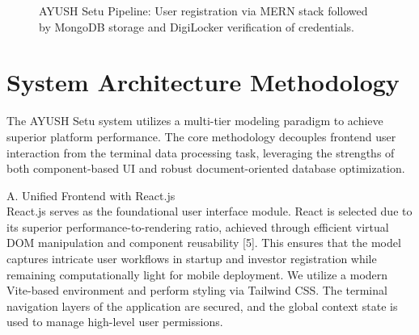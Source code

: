 \documentclass[conference]{IEEEtran}
\begin{document}
\begin{figure}[!t]
\centering
{}
\caption{AYUSH Setu Pipeline: User registration via MERN stack followed by MongoDB storage and DigiLocker verification of credentials.}
\label{fig:ai_pipeline}
\end{figure}

\section{System Architecture Methodology}
The AYUSH Setu system utilizes a multi-tier modeling paradigm to achieve superior platform performance. The core methodology decouples frontend user interaction from the terminal data processing task, leveraging the strengths of both component-based UI and robust document-oriented database optimization.

A. Unified Frontend with React.js\\
React.js serves as the foundational user interface module. React is selected due to its superior performance-to-rendering ratio, achieved through efficient virtual DOM manipulation and component reusability [5]. This ensures that the model captures intricate user workflows in startup and investor registration while remaining computationally light for mobile deployment. We utilize a modern Vite-based environment and perform styling via Tailwind CSS. The terminal navigation layers of the application are secured, and the global context state is used to manage high-level user permissions.
\end{document}
